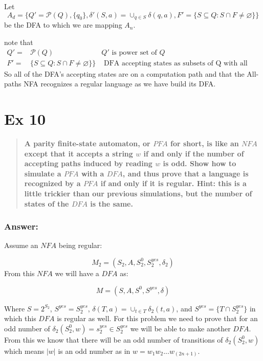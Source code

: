 \documentclass[titlepage]{article}\usepackage[]{graphicx}\usepackage[]{color}
\begin{document}
Let \[ A_d = \{Q' = \mathcal{P}(Q), \{ q_0 \}, \delta'(S,a) = \cup_{q \in S}
\delta(q,a), F' = \{ S \subseteq Q : S \cap F \neq \varnothing \} \} \]
be the DFA to which we are mapping $A_n$.

note that
\begin{align*}
  Q' =& \mathcal{P}(Q)& Q' \text{ is power set of } Q \\ 
  F' =& \{ S \subseteq Q : S \cap F \neq \varnothing \} \} &\text{ DFA accepting states
  as subsets of Q with all elements accepting } 
\end{align*}
So all of the DFA's accepting states are on a computation path and that the
All-paths NFA recognizes a regular language as we have build its DFA.




\section*{Ex 10}
\begin{quote}
  \textbf{ A parity finite-state automaton, or $PFA$ for short, is like an
    $NFA$ except that it accepts a string $w$ if and only if the number of
    accepting paths induced by reading $w$ is odd. Show how to simulate a $PFA$
    with a $DFA$, and thus prove that a language is recognized by a $PFA$ if
    and only if it is regular. Hint: this is a little trickier than our
  previous simulations, but the number of states of the $DFA$ is the same.}
\end{quote}

\subsubsection*{Answer:}
Assume an $NFA$ being regular:

\[ 
  M_2 = (S_2, A, S^0_2, S^{yes}_2, \delta_2)
\]
From this $NFA$ we will have a $DFA$ as:

\[ 
  M = (S, A, S^0, S^{yes}, \delta)
\]

Where $S = 2^{S_2}$, $S^{yes} = {S^{yes}_2}$, $\delta(T, a) = \cup_{t\in T}
\delta_2(t, a)$, and $S^{yes} = \{T\cap S^{yes}_2\}$ in which this $DFA$ is
regular as well. For this problem we need to prove that for an odd number of
$\delta_2(S^0_2, w) = s^{yes}_2 \in S^{yes}_2$ we will be able to make another
$DFA$. From this we know that there will be an odd number of transitions of
$\delta_2(S^0_2, w)$ which means $|w|$ is an odd number as in
$w=w_1w_2...w_(2n+1)$.  
\end{document}
